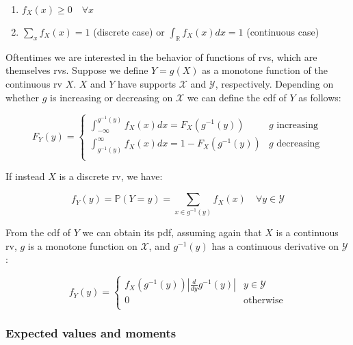 \documentclass{report}
\begin{document}
\begin{enumerate}
    \item $f_X(x) \geq 0 \quad \forall x$
    \item $\sum_x f_X(x) = 1$ (discrete case) or $\int_{\mathbb{R}} f_X(x) dx = 1$ (continuous case) 
\end{enumerate}

Oftentimes we are interested in the behavior of functions of \glspl{rv}, which are themselves \glspl{rv}. Suppose we define $Y = g(X)$ as a monotone function of the continuous \gls{rv} $X$. $X$ and $Y$ have supports $\mathcal{X}$ and $\mathcal{Y}$, respectively. Depending on whether $g$ is increasing or decreasing on $\mathcal{X}$ we can define the \gls{cdf} of $Y$ as follows:

\begin{equation}\label{eq:cdf-of-transformation}
    F_Y(y) = \begin{cases}
        \int_{-\infty}^{g^{-1}(y)} f_X(x) dx = F_X\left(g^{-1}(y)\right) & g \text{ increasing} \\
        \int_{g^{-1}(y)}^\infty f_X(x) dx = 1 - F_X\left(g^{-1}(y)\right) & g \text{ decreasing} \\
    \end{cases}
\end{equation}

If instead $X$ is a discrete \gls{rv}, we have:

\begin{equation}\label{eq:pmf-of-transformation}
    f_Y(y) = \mathbb{P}(Y = y) = \sum_{x \in g^{-1}(y)} f_X(x) \quad \forall y \in \mathcal{Y}
\end{equation}

From the \gls{cdf} of $Y$ we can obtain its \gls{pdf}, assuming again that $X$ is a continuous \gls{rv}, $g$ is a monotone function on $\mathcal{X}$, and $g^{-1}(y)$ has a continuous derivative on $\mathcal{Y}$:

\begin{equation}\label{eq:pdf-of-transformation}
    f_Y(y) = \begin{cases}
        f_X\left(g^{-1}(y)\right) \left|\frac{d}{dy}g^{-1}(y)\right| & y \in \mathcal{Y} \\
        0 & \text{otherwise} \\
    \end{cases}
\end{equation}

\subsubsection{Expected values and moments}
\end{document}

